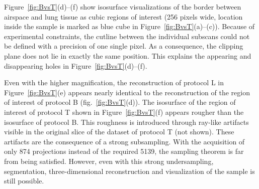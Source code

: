 Figure~\ref{fig:BvsT}(d)--(f) show isosurface visualizations of the border between airspace and lung tissue as cubic regions of interest (256 pixels wide, location inside the sample is marked as blue cube in Figure~\ref{fig:BvsT}(a)--(c)). Because of experimental constraints, the cutline between the individual subscans could not be defined with a precision of one single pixel. As a consequence, the clipping plane does not lie in exactly the same position. This explains the appearing and disappearing holes in Figure~\ref{fig:BvsT}(d)--(f).

Even with the higher magnification, the reconstruction of protocol L in Figure~\ref{fig:BvsT}(e) appears nearly identical to the reconstruction of the region of interest of protocol B (fig.~\ref{fig:BvsT}(d)). The isosurface of the region of interest of protocol T shown in Figure~\ref{fig:BvsT}(f) appears rougher than the isosurface of protocol B. This roughness is introduced through ray-like artifacts visible in the original slice of the dataset of protocol T (not shown). These artifacts are the consequence of a strong subsampling. With the acquisition of only 874 projections instead of the required 5139, the sampling theorem is far from being satisfied. However, even with this strong undersampling, segmentation, three-dimensional reconstruction and visualization of the sample is still possible.

